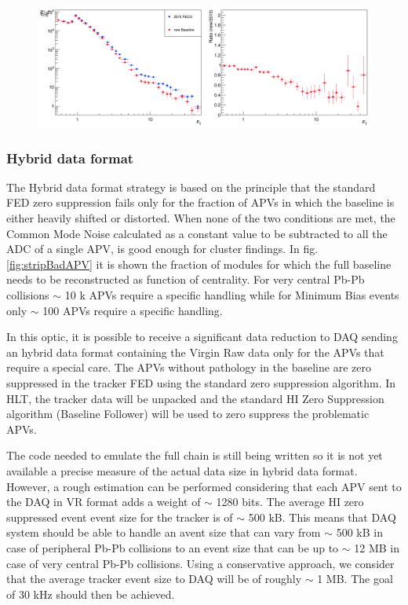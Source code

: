 \begin{figure}[htbp]
\begin{center}
\includegraphics[width=.80\textwidth]{figures/DerivativeFollowerEfficiency.png}
\caption{}
\label{fig:stripDerivFollowerPerf}
\end{center}
\end{figure}


\subsubsection{Hybrid data format \label{subsubsec:hybridtracker}}
The Hybrid data format strategy is based on the principle that the standard FED zero suppression fails only for the fraction of APVs in which the baseline is either heavily shifted or distorted. When none of the two conditions are met, the Common Mode Noise calculated as a constant value to be subtracted to all the ADC of a single APV, is good enough for cluster findings. In fig. \ref{fig:stripBadAPV} it is shown the fraction of modules for which the full baseline needs to be reconstructed as function of centrality. 
For very central Pb-Pb collisions $\sim$ 10 k APVs require a specific handling while for Minimum Bias events only $\sim$ 100 APVs require a specific handling.

In this optic, it is possible to receive a significant data reduction to DAQ sending an hybrid data format containing the Virgin Raw data only for the APVs that require a special care. The APVs without pathology in the baseline are zero suppressed in the tracker FED using the standard zero suppression algorithm. In HLT, the tracker data will be unpacked and the standard HI Zero Suppression algorithm (Baseline Follower) will be used to zero suppress the problematic APVs. 

The code needed to emulate the full chain is still being written so it is not yet available a precise measure of the actual data size in hybrid data format. However, a rough estimation can be performed considering that each APV sent to the DAQ in VR format adds a weight of $\sim$ 1280 bits. The average HI zero suppressed event event size for the tracker is of $\sim$ 500 kB. This means that DAQ system should be able to handle an avent size that can vary from $\sim$ 500 kB in case of peripheral Pb-Pb collisions to an event size that can be up to $\sim$ 12 MB in case of very central Pb-Pb collisions. Using a conservative approach, we consider that the average tracker event size to DAQ will be of roughly $\sim$ 1 MB.  The goal of 30 kHz should then be achieved.

